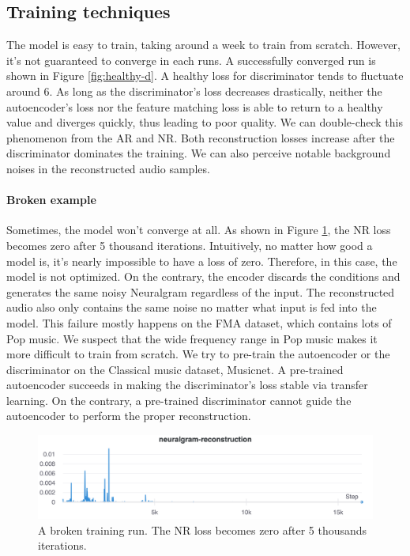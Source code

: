 \documentclass[12pt]{article}
\begin{document}
\subsection{Training techniques}
The model is easy to train, taking around a week to train from scratch. However, it's not guaranteed to converge in each runs. A successfully converged run is shown in Figure \ref{fig:healthy-d}. A healthy loss for discriminator tends to fluctuate around 6. As long as the discriminator's loss decreases drastically, neither the autoencoder's loss nor the feature matching loss is able to return to a healthy value and diverges quickly, thus leading to poor quality. We can double-check this phenomenon from the AR and NR. Both reconstruction losses increase after the discriminator dominates the training. We can also perceive notable background noises in the reconstructed audio samples.

\paragraph{Broken example} Sometimes, the model won't converge at all. As shown in Figure \ref{fig:broken-nr}, the NR loss becomes zero after 5 thousand iterations. Intuitively, no matter how good a model is, it's nearly impossible to have a loss of zero. Therefore, in this case, the model is not optimized. On the contrary, the encoder discards the conditions and generates the same noisy Neuralgram regardless of the input. The reconstructed audio also only contains the same noise no matter what input is fed into the model. This failure mostly happens on the FMA dataset, which contains lots of Pop music. We suspect that the wide frequency range in Pop music makes it more difficult to train from scratch. We try to pre-train the autoencoder or the discriminator on the Classical music dataset, Musicnet. A pre-trained autoencoder succeeds in making the discriminator's loss stable via transfer learning. On the contrary, a pre-trained discriminator cannot guide the autoencoder to perform the proper reconstruction.

\begin{figure}
\begin{center}
  \includegraphics[width=\textwidth]{assets/figures/broken-nr}
\end{center}
\caption{A broken training run. The NR loss becomes zero after 5 thousands iterations.}
\label{fig:broken-nr}
\end{figure}
\end{document}
